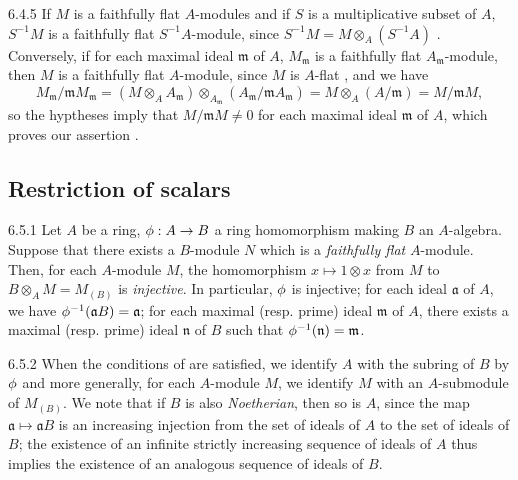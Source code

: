 \begin{env}{6.4.5}
\label{env-0.6.4.5}
If $M$ is a faithfully flat $A$-modules and if $S$ is a multiplicative subset of $A$,
$S^{-1}M$ is a faithfully flat $S^{-1}A$-module, since $S^{-1}M=M\otimes_A(S^{-1}A)$
. Conversely, if for each maximal ideal $\mathfrak{m}$ of $A$,
$M_\mathfrak{m}$ is a faithfully flat $A_\mathfrak{m}$-module, then $M$ is a faithfully flat
$A$-module, since $M$ is $A$-flat , and we have
\[
  M_\mathfrak{m}/\mathfrak{m}M_\mathfrak{m}
  =(M\otimes_A A_\mathfrak{m})
  \otimes_{A_\mathfrak{m}}(A_\mathfrak{m}/\mathfrak{m}A_\mathfrak{m})
  =M\otimes_A(A/\mathfrak{m})=M/\mathfrak{m}M,
\]
so the hyptheses imply that $M/\mathfrak{m}M\neq 0$ for each maximal ideal $\mathfrak{m}$ of
$A$, which proves our assertion .
\end{env}

\subsection{Restriction of scalars}
\label{0-prelim-6.5}

\begin{env}{6.5.1}
\label{env-0.6.5.1}
Let $A$ be a ring, $\phi:A\to B$ a ring homomorphism making $B$ an $A$-algebra. Suppose that
there exists a $B$-module $N$ which is a \emph{faithfully flat} $A$-module. Then, for each
$A$-module $M$, the homomorphism $x\mapsto 1\otimes x$ from $M$ to $B\otimes_A M=M_{(B)}$ is
\emph{injective}. In particular, $\phi$ is injective; for each ideal $\mathfrak{a}$ of $A$,
we have $\phi^{-1}(\mathfrak{a}B)=\mathfrak{a}$; for each maximal (resp. prime) ideal
$\mathfrak{m}$ of $A$, there exists a maximal (resp. prime) ideal $\mathfrak{n}$ of $B$ such
that $\phi^{-1}(\mathfrak{n})=\mathfrak{m}$.
\end{env}

\begin{env}{6.5.2}
\label{env-0.6.5.2}
When the conditions of  are satisfied, we identify $A$ with the subring of
$B$ by $\phi$ and more generally, for each $A$-module $M$, we identify $M$ with an
$A$-submodule of $M_{(B)}$. We note that if $B$ is also \emph{Noetherian}, then so is $A$,
since the map $\mathfrak{a}\mapsto\mathfrak{a}B$ is an increasing injection from the set of
ideals of $A$ to the set of ideals of $B$; the existence of an infinite strictly increasing
sequence of ideals of $A$ thus implies the existence of an analogous sequence of ideals of
$B$.
\end{env}

